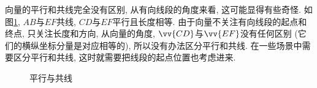 \begin{remark}
  向量的平行和共线完全没有区别, 从有向线段的角度来看, 这可能显得有些奇怪.
  如图\ref{fig:parallel}, $AB$与$EF$共线, $CD$与$EF$平行且长度相等.
  由于向量不关注有向线段的起点和终点, 只关注长度和方向,
  从向量的角度, $\vv{CD}$与$\vv{EF}$没有任何区别
  (它们的横纵坐标分量是对应相等的), 所以没有办法区分平行和共线.
  在一些场景中需要区分平行和共线, 这时就需要把线段的起点位置也考虑进来.
  
  \begin{figure}[htbp]
    \centering
    \caption{平行与共线}
    \label{fig:parallel}
  \end{figure}
\end{remark}
